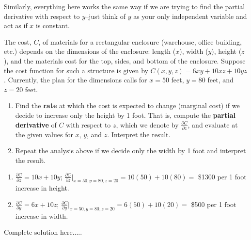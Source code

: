\noindent Similarly, everything here works the same way if we are trying to find the partial derivative with respect to $y$--just think of $y$ as your only independent variable and act as if $x$ is constant.
\begin{example}
The cost, $C$, of materials for a rectangular enclosure (warehouse, office building, etc.) depends on the dimensions of the enclosure: length ($x$), width ($y$), height ($z$), and the materials cost for the top, sides, and bottom of the enclosure.  Suppose the cost function for such a structure is given by $C(x,y,z)=6xy+10xz+10yz$.  Currently, the plan for the dimensions calls for $x=50$ feet, $y=80$ feet, and $z=20$ feet.  
\renewcommand{\labelenumi}{\textbf{(\alph{enumi})}}
\begin{enumerate}[leftmargin=*]
    \item Find the \textbf{rate} at which the cost is expected to change (marginal cost) if we decide to increase only the height by 1 foot.  That is, compute the \textbf{partial derivative} of $C$ with respect to $z$, which we denote by $\displaystyle \frac{\partial C}{\partial z}$, and evaluate at the given values for $x$, $y$, and $z$.  Interpret the result.                                                
    \item Repeat the analysis above if we decide only the width by 1 foot and interpret the result.  

    \end{enumerate}
    \begin{sol}
    \renewcommand{\labelenumi}{\textbf{(\alph{enumi})}}
    \begin{enumerate}[leftmargin=*]
    \item $\displaystyle \frac{\partial C}{\partial z}=10x+10y$; $\displaystyle \frac{\partial C}{\partial z}\Big|_{x=50,y=80,z=20}=10(50)+10(80)=$ \$1300 per 1 foot increase in height.
    \item $\displaystyle \frac{\partial C}{\partial y}=6x+10z$; $\displaystyle \frac{\partial C}{\partial y}\Big|_{x=50,y=80,z=20}=6(50)+10(20)=$ \$500 per 1 foot increase in width.
    \end{enumerate}
    \end{sol}
    \begin{solL}
    Complete solution here.....
    
    \end{solL}
    
\end{example}

